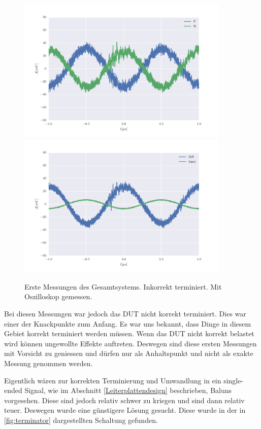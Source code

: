 \begin{figure}[ht]
\begin{center}
    \includegraphics[width=0.9\textwidth]{data/images/messungen/zweite_messung_NP}
    \includegraphics[width=0.9\textwidth]{data/images/messungen/zweite_messung_INOUT}
    \caption{Erste Messungen des Gesamtsystems. Inkorrekt terminiert. Mit Oszilloskop gemessen.}
    \label{fig:messungen_zweite}
\end{center}
\end{figure}

Bei diesen Messungen war jedoch das DUT nicht korrekt terminiert. Dies war einer der Knackpunkte zum Anfang. Es war uns bekannt, dass Dinge in diesem Gebiet korrekt terminiert werden müssen. Wenn das DUT nicht korrekt belastet wird können ungewollte Effekte auftreten. Deswegen sind diese ersten Messungen mit Vorsicht zu geniessen und dürfen nur als Anhaltspunkt und nicht als exakte Messung genommen werden.

Eigentlich wären zur korrekten Terminierung und Umwandlung in ein single-ended Signal, wie im Abschnitt \ref{Leiterplattendesign} beschrieben, Baluns vorgesehen. Diese sind jedoch relativ schwer zu kriegen und sind dann relativ teuer. Deswegen wurde eine günstigere Lösung gesucht. Diese wurde in der in \ref{fig:terminator} dargestellten Schaltung gefunden.

